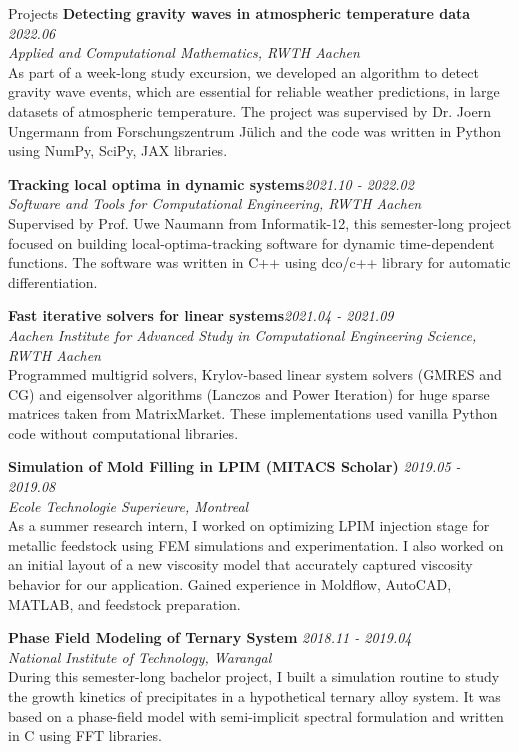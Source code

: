 \documentclass{resume}
\begin{document}
\begin{rSection}{Projects}
{\bf Detecting gravity waves in atmospheric temperature data} \hfill {\em2022.06}\\
{\em Applied and Computational Mathematics, RWTH Aachen}\\
As part of a week-long study excursion, we developed an algorithm to detect gravity wave events, which are essential for reliable weather predictions, in large datasets of atmospheric temperature. The project was supervised by Dr. Joern Ungermann from Forschungszentrum Jülich and the code was written in Python using NumPy, SciPy, JAX libraries.

{\bf Tracking local optima in dynamic systems}\hfill {\em 2021.10 - 2022.02}\\
{\em Software and Tools for Computational Engineering, RWTH Aachen}\\
Supervised by Prof. Uwe Naumann from Informatik-12, this semester-long project focused on building local-optima-tracking software for dynamic time-dependent functions. The software was written in C++ using dco/c++ library for automatic differentiation. 

{\bf Fast iterative solvers for linear systems}\hfill {\em 2021.04 - 2021.09}\\
{\em Aachen Institute for Advanced Study in Computational Engineering Science, RWTH Aachen}\\
Programmed multigrid solvers, Krylov-based linear system solvers (GMRES and CG) and eigensolver algorithms (Lanczos and Power Iteration) for huge sparse matrices taken from MatrixMarket. These implementations used vanilla Python code without computational libraries.

{\bf Simulation of Mold Filling in LPIM (MITACS Scholar)} \hfill {\em 2019.05 - 2019.08}\\
{\em Ecole Technologie Superieure, Montreal}\\
As a summer research intern, I worked on optimizing LPIM injection stage for metallic feedstock using FEM simulations and experimentation. I also worked on an initial layout of a new viscosity model that accurately captured viscosity behavior for our application. Gained experience in Moldflow, AutoCAD, MATLAB, and feedstock preparation.

{\bf Phase Field Modeling of Ternary System} \hfill {\em 2018.11 - 2019.04}\\
{\em National Institute of Technology, Warangal}\\
During this semester-long bachelor project, I built a simulation routine to study the growth kinetics of precipitates in a hypothetical ternary alloy system. It was based on a phase-field model with semi-implicit spectral formulation and written in C using FFT libraries.
\end{rSection}
\end{document}
